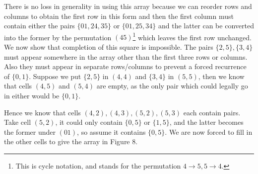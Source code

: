 \documentclass[
  12pt,
  a4paper]{book}
\begin{document}
There is no loss in generality in using this array because we can
reorder rows and columns to obtain the first row in this form and then
the first column must contain either the pairs \(\{01, 24, 35\}\) or
\(\{01, 25, 34\}\) and the latter can be converted into the former by
the permutation \((45)\)\footnote{This is cycle notation, and stands for
  the permutation \(4 \rightarrow 5, 5 \rightarrow 4\).} which leaves
the first row unchanged. We now show that completion of this square is
impossible. The pairs \(\{2,5\},\{3,4\}\) must appear somewhere in the
array other than the first three rows or columns. Also they must appear
in separate rows/columns to prevent a forced recurrence of \(\{0, 1\}\).
Suppose we put \(\{2, 5\}\) in \((4, 4)\) and \(\{3, 4\}\) in
\((5, 5)\), then we know that cells \((4, 5)\) and \((5, 4)\) are empty,
as the only pair which could legally go in either would be \(\{0, 1\}\).

Hence we know that cells \((4, 2), (4, 3), (5, 2), (5, 3)\) each contain
pairs. Take cell \((5, 2)\), it could only contain \(\{0, 5\}\) or
\(\{1, 5\}\), and the latter becomes the former under \((01)\), so
assume it contains \(\{0, 5\}\). We are now forced to fill in the other
cells to give the array in Figure 8.
\end{document}
